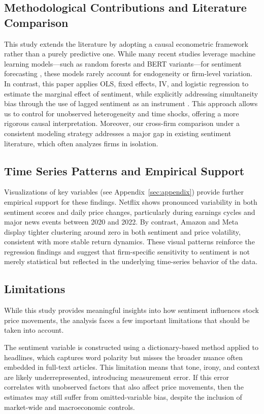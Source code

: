 \documentclass[12pt]{article}
\begin{document}
\subsection{Methodological Contributions and Literature Comparison}
This study extends the literature by adopting a causal econometric framework rather than a purely predictive one. While many recent studies leverage machine learning models—such as random forests and BERT variants—for sentiment forecasting \citep{fazlija2022bert, patil2024sentiment}, these models rarely account for endogeneity or firm-level variation. In contrast, this paper applies OLS, fixed effects, IV, and logistic regression to estimate the marginal effect of sentiment, while explicitly addressing simultaneity bias through the use of lagged sentiment as an instrument \citep{tetlock2007giving}. This approach allows us to control for unobserved heterogeneity and time shocks, offering a more rigorous causal interpretation. Moreover, our cross-firm comparison under a consistent modeling strategy addresses a major gap in existing sentiment literature, which often analyzes firms in isolation.

\subsection{Time Series Patterns and Empirical Support}
Visualizations of key variables (see Appendix~\ref{sec:appendix}) provide further empirical support for these findings. Netflix shows pronounced variability in both sentiment scores and daily price changes, particularly during earnings cycles and major news events between 2020 and 2022. By contrast, Amazon and Meta display tighter clustering around zero in both sentiment and price volatility, consistent with more stable return dynamics. These visual patterns reinforce the regression findings and suggest that firm-specific sensitivity to sentiment is not merely statistical but reflected in the underlying time-series behavior of the data.


\subsection{Limitations}

While this study provides meaningful insights into how sentiment influences stock price movements, the analysis faces a few important limitations that should be taken into account.

The sentiment variable is constructed using a dictionary-based method applied to headlines, which captures word polarity but misses the broader nuance often embedded in full-text articles. This limitation means that tone, irony, and context are likely underrepresented, introducing measurement error. If this error correlates with unobserved factors that also affect price movements, then the estimates may still suffer from omitted-variable bias, despite the inclusion of market-wide and macroeconomic controls.
\end{document}
